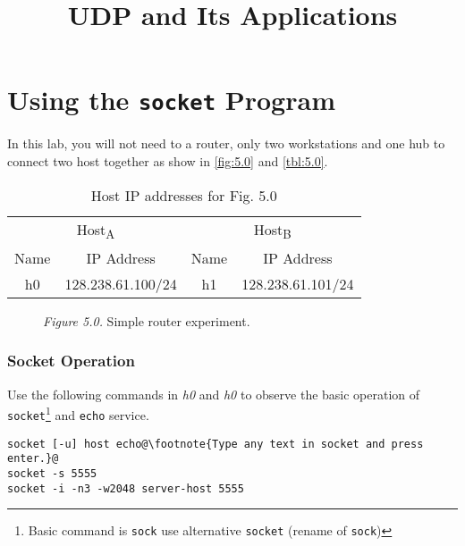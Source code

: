 \documentclass{../UTNetLab}
\title{UDP and Its Applications}
\begin{document}
\part{Using the \texttt{socket} Program}
\label{sec:schema}
    In this lab, you will not need to a router, only two workstations and one hub to connect two host together as show in \autoref{fig:5.0} and \autoref{tbl:5.0}.
    \begin{table}[H]
        \caption{Host IP addresses for Fig. 5.0}
        \label{tbl:5.0}
        \centering
        \begin{tabular}{ *2c|*2c }
            \hline \hline
            \multicolumn{2}{c|}{Host\textsubscript{A}} & \multicolumn{2}{c}{Host\textsubscript{B}} \\
            Name & IP Address & Name & IP Address \\
            \hline 
            h0 & 128.238.61.100/24 & h1 & 128.238.61.101/24\\
            \hline \hline
            \end{tabular}
    \end{table}

    \begin{figure}[H]
        \centering
        \caption{\textit{Figure 5.0.} Simple router experiment.}        
        \label{fig:5.0}
    \end{figure}

\section{Socket Operation}
    Use the following commands in \textit{h0} and \textit{h0} to observe the basic operation of \lstinline{socket}\footnote{Basic command is \lstinline{sock} use alternative \lstinline{socket} (rename of \lstinline{sock})} and \lstinline{echo} service.
    \begin{lstlisting}[emph={host, server-host}]
socket [-u] host echo@\footnote{Type any text in socket and press enter.}@
socket -s 5555
socket -i -n3 -w2048 server-host 5555
    \end{lstlisting}
\end{document}

